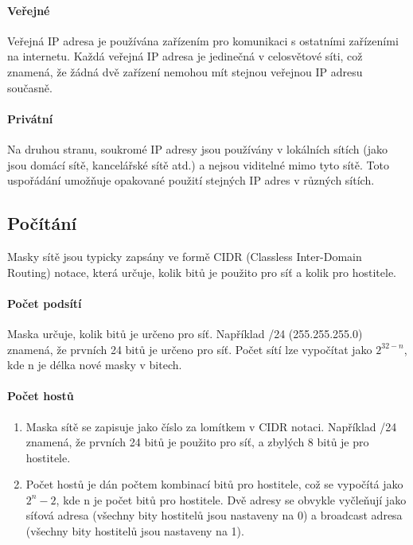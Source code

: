 \paragraph{Veřejné}
Veřejná IP adresa je používána zařízením pro komunikaci s ostatními zařízeními na internetu. Každá veřejná IP adresa je jedinečná v celosvětové síti, což znamená, že žádná dvě zařízení nemohou mít stejnou veřejnou IP adresu současně.
\paragraph{Privátní}
Na druhou stranu, soukromé IP adresy jsou používány v lokálních sítích (jako jsou domácí sítě, kancelářské sítě atd.) a nejsou viditelné mimo tyto sítě. Toto uspořádání umožňuje opakované použití stejných IP adres v různých sítích.

\subsection{Počítání}
 Masky sítě jsou typicky zapsány ve formě CIDR (Classless Inter-Domain Routing) notace, která určuje, kolik bitů je použito pro síť a kolik pro hostitele.
\paragraph{Počet podsítí}
Maska určuje, kolik bitů je určeno pro síť. Například /24 (255.255.255.0) znamená, že prvních 24 bitů je určeno pro síť.
Počet sítí lze vypočítat jako $2^{32-n}$, kde n je délka nové masky v bitech.
\paragraph{Počet hostů}
\begin{enumerate}
    \item Maska sítě se zapisuje jako číslo za lomítkem v CIDR notaci. Například /24 znamená, že prvních 24 bitů je použito pro síť, a zbylých 8 bitů je pro hostitele.
    \item Počet hostů je dán počtem kombinací bitů pro hostitele, což se vypočítá jako $2^n-2$, kde n je počet bitů pro hostitele.
    Dvě adresy se obvykle vyčleňují jako síťová adresa (všechny bity hostitelů jsou nastaveny na 0) a broadcast adresa (všechny bity hostitelů jsou nastaveny na 1).
\end{enumerate}

